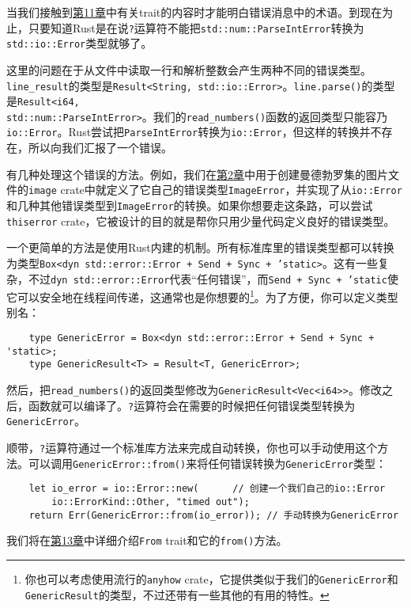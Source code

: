 当我们接触到\hyperref[ch11]{第11章}中有关trait的内容时才能明白错误消息中的术语。到现在为止，只要知道Rust是在说\texttt{?}运算符不能把\texttt{std::num::ParseIntError}转换为\texttt{std::io::Error}类型就够了。

这里的问题在于从文件中读取一行和解析整数会产生两种不同的错误类型。\texttt{line\_result}的类型是\texttt{Result<String, std::io::Error>}。\texttt{line.parse()}的类型是\texttt{Result<i64,\\
std::num::ParseIntError>}。我们的\texttt{read\_numbers()}函数的返回类型只能容乃\texttt{io::Error}。Rust尝试把\texttt{ParseIntError}转换为\texttt{io::Error}，但这样的转换并不存在，所以向我们汇报了一个错误。

有几种处理这个错误的方法。例如，我们在\hyperref[ch02]{第2章}中用于创建曼德勃罗集的图片文件的\texttt{image} crate中就定义了它自己的错误类型\texttt{ImageError}，并实现了从\texttt{io::Error}和几种其他错误类型到\texttt{ImageError}的转换。如果你想要走这条路，可以尝试\texttt{thiserror} crate，它被设计的目的就是帮你只用少量代码定义良好的错误类型。

一个更简单的方法是使用Rust内建的机制。所有标准库里的错误类型都可以转换为类型\texttt{Box<dyn std::error::Error + Send + Sync + 'static>}。这有一些复杂，不过\texttt{dyn std::error::Error}代表“任何错误”，而\texttt{Send + Sync + 'static}使它可以安全地在线程间传递，这通常也是你想要的\footnote{你也可以考虑使用流行的\texttt{anyhow} crate，它提供类似于我们的\texttt{GenericError}和\texttt{GenericResult}的类型，不过还带有一些其他的有用的特性。}。为了方便，你可以定义类型别名：
\begin{verbatim}
    type GenericError = Box<dyn std::error::Error + Send + Sync + 'static>;
    type GenericResult<T> = Result<T, GenericError>;
\end{verbatim}

然后，把\texttt{read\_numbers()}的返回类型修改为\texttt{GenericResult<Vec<i64>>}。修改之后，函数就可以编译了。\texttt{?}运算符会在需要的时候把任何错误类型转换为\texttt{GenericError}。

顺带，\texttt{?}运算符通过一个标准库方法来完成自动转换，你也可以手动使用这个方法。可以调用\texttt{GenericError::from()}来将任何错误转换为\texttt{GenericError}类型：
\begin{verbatim}
    let io_error = io::Error::new(      // 创建一个我们自己的io::Error
        io::ErrorKind::Other, "timed out");
    return Err(GenericError::from(io_error)); // 手动转换为GenericError
\end{verbatim}

我们将在\hyperref[ch13]{第13章}中详细介绍\texttt{From} trait和它的\texttt{from()}方法。

